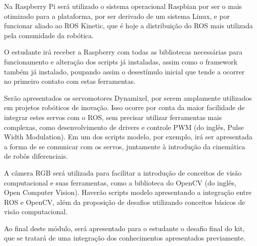 Na Raspberry Pi será utilizado o sistema operacional Raspbian por ser o mais otimizado para a plataforma, por ser derivado de um sistema Linux, e por funcionar
aliado ao ROS Kinetic, que é hoje a distribuição do ROS mais utilizada pela comunidade da robótica.

O estudante irá receber a Raspberry com todas as bibliotecas necessárias para funcionamento e alteração dos scripts já instaladas, assim como o framework também já instalado, poupando assim o desestímulo inicial que tende a ocorrer no primeiro contato com estas ferramentas.

Serão apresentados os servomotores Dynamixel, por serem amplamente utilizados em projetos robóticos de inovação. Isso ocorre por conta da maior facilidade de integrar estes servos com o ROS, sem precisar utilizar ferramentas mais complexas, como desenvolvimento de drivers e controle PWM (do inglês, Pulse Width Modulation). Em um dos scripts modelo, por exemplo, irá ser apresentada a forma de se comunicar com os servos, juntamente à introdução da cinemática de robôs diferenciais.

A câmera RGB será utilizada para facilitar a introdução de conceitos de visão computacional e suas ferramentas, como a biblioteca do OpenCV (do inglês, Open Computer Vision). Haverão scripts modelo apresentando a integração entre ROS e OpenCV, além da proposição de desafios utilizando conceitos básicos de visão computacional. 

Ao final deste módulo, será apresentado para o estudante o desafio final do kit, que se tratará de uma integração dos conhecimentos apresentados previamente.
